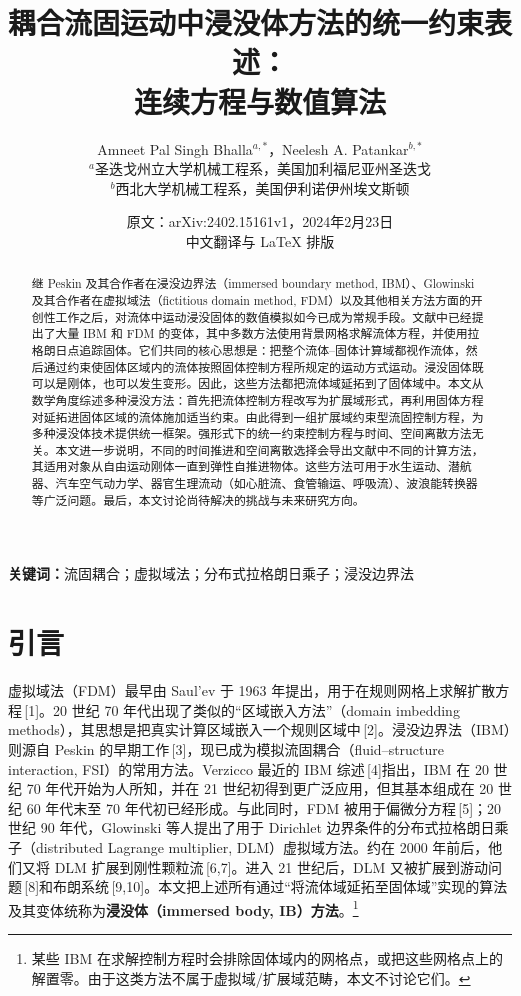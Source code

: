 \documentclass[UTF8,11pt,a4paper]{ctexart}
\title{耦合流固运动中浸没体方法的统一约束表述：\\连续方程与数值算法}
\author{Amneet Pal Singh Bhalla$^{a,*}$，Neelesh A. Patankar$^{b,*}$\\[0.4em]
\small $^a$圣迭戈州立大学机械工程系，美国加利福尼亚州圣迭戈\\
\small $^b$西北大学机械工程系，美国伊利诺伊州埃文斯顿}
\date{原文：arXiv:2402.15161v1，2024年2月23日\\中文翻译与 \LaTeX{} 排版}
\begin{document}
\maketitle

\begin{abstract}
继 Peskin 及其合作者在浸没边界法（immersed boundary method, IBM）、Glowinski 及其合作者在虚拟域法（fictitious domain method, FDM）以及其他相关方法方面的开创性工作之后，对流体中运动浸没固体的数值模拟如今已成为常规手段。文献中已经提出了大量 IBM 和 FDM 的变体，其中多数方法使用背景网格求解流体方程，并使用拉格朗日点追踪固体。它们共同的核心思想是：把整个流体--固体计算域都视作流体，然后通过约束使固体区域内的流体按照固体控制方程所规定的运动方式运动。浸没固体既可以是刚体，也可以发生变形。因此，这些方法都把流体域延拓到了固体域中。本文从数学角度综述多种浸没方法：首先把流体控制方程改写为扩展域形式，再利用固体方程对延拓进固体区域的流体施加适当约束。由此得到一组扩展域约束型流固控制方程，为多种浸没体技术提供统一框架。强形式下的统一约束控制方程与时间、空间离散方法无关。本文进一步说明，不同的时间推进和空间离散选择会导出文献中不同的计算方法，其适用对象从自由运动刚体一直到弹性自推进物体。这些方法可用于水生运动、潜航器、汽车空气动力学、器官生理流动（如心脏流、食管输运、呼吸流）、波浪能转换器等广泛问题。最后，本文讨论尚待解决的挑战与未来研究方向。
\end{abstract}

\noindent\textbf{关键词：}流固耦合；虚拟域法；分布式拉格朗日乘子；浸没边界法

\tableofcontents
\newpage

\section{引言}

虚拟域法（FDM）最早由 Saul'ev 于 1963 年提出，用于在规则网格上求解扩散方程\,[1]。20 世纪 70 年代出现了类似的“区域嵌入方法”（domain imbedding methods），其思想是把真实计算区域嵌入一个规则区域中\,[2]。浸没边界法（IBM）则源自 Peskin 的早期工作\,[3]，现已成为模拟流固耦合（fluid--structure interaction, FSI）的常用方法。Verzicco 最近的 IBM 综述\,[4]指出，IBM 在 20 世纪 70 年代开始为人所知，并在 21 世纪初得到更广泛应用，但其基本组成在 20 世纪 60 年代末至 70 年代初已经形成。与此同时，FDM 被用于偏微分方程\,[5]；20 世纪 90 年代，Glowinski 等人提出了用于 Dirichlet 边界条件的分布式拉格朗日乘子（distributed Lagrange multiplier, DLM）虚拟域方法。约在 2000 年前后，他们又将 DLM 扩展到刚性颗粒流\,[6,7]。进入 21 世纪后，DLM 又被扩展到游动问题\,[8]和布朗系统\,[9,10]。本文把上述所有通过“将流体域延拓至固体域”实现的算法及其变体统称为\textbf{浸没体（immersed body, IB）方法}。\footnote{某些 IBM 在求解控制方程时会排除固体域内的网格点，或把这些网格点上的解置零。由于这类方法不属于虚拟域/扩展域范畴，本文不讨论它们。}
\end{document}
